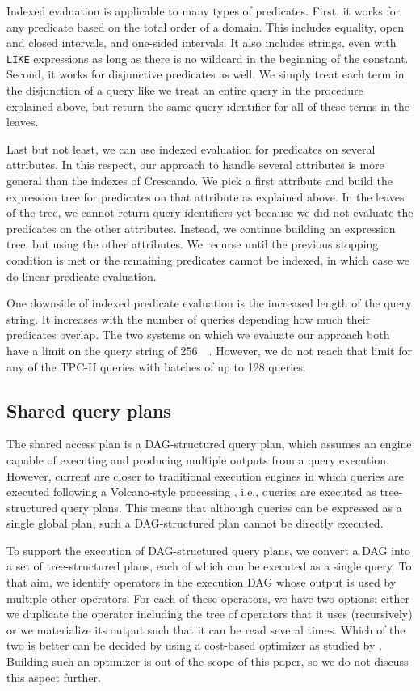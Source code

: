 Indexed evaluation is applicable to many types of predicates.
First, it works for any predicate based on the total order of a domain.
This includes equality, open and closed intervals, and one-sided intervals.
It also includes strings,
even with \lstinline[style=sql]{LIKE} expressions
as long as there is no wildcard in the beginning of the constant.
Second, it works for disjunctive predicates as well.
We simply treat each term in the disjunction of a query
like we treat an entire query in the procedure explained above,
but return the same query identifier for all of these terms in the leaves.

Last but not least, we can use indexed evaluation
for predicates on several attributes.
In this respect, our approach to handle several attributes is more general than the indexes of Crescando.
We pick a first attribute and build the expression tree
for predicates on that attribute as explained above.
In the leaves of the tree, we cannot return query identifiers yet
because we did not evaluate the predicates on the other attributes.
Instead, we continue building an expression tree,
but using the other attributes.
We recurse until the previous stopping condition is met
or the remaining predicates cannot be indexed,
in which case we do linear predicate evaluation.

One downside of indexed predicate evaluation
is the increased length of the query string.
It increases with the number of queries
depending how much their predicates overlap.
The two systems on which we evaluate our approach
both have a limit on the query string of \SI{256}{\kibi\byte}.
However, we do not reach that limit for any of the TPC-H queries
with batches of up to 128 queries.


\subsection{Shared query plans}
\label{sec:shared_qplans}

The shared access plan is a DAG-structured query plan, which assumes an engine
capable of executing and producing multiple outputs from a query execution.
However, current \qaasl are closer
to traditional execution engines in which queries are executed following a
Volcano-style processing \cite{Graefe:1993:VOG:645478.757691}, i.e., queries are
executed as tree-structured query plans.  This means that although queries can
be expressed as a single global plan, such a DAG-structured plan cannot be
directly executed.

To support the execution of DAG-structured query plans,
we convert a DAG into a set of tree-structured plans,
each of which can be executed as a single query.
To that aim, we identify operators in the execution DAG
whose output is used by multiple other operators.
For each of these operators, we have two options:
either we duplicate the operator including the tree of operators that it uses
(recursively)
or we materialize its output such that it can be read several times.
Which of the two is better can be decided
by using a cost-based optimizer as studied
by \cite{Neumann2009, Finkelstein:1982:CEA:582353.582400}.
Building such an optimizer is out of the scope of this paper,
so we do not discuss this aspect further.
